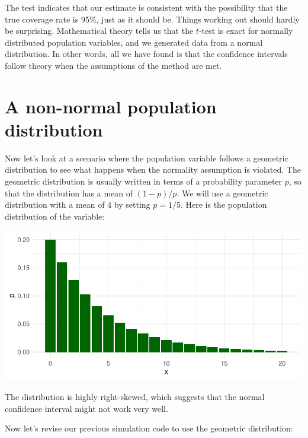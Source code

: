 \documentclass[
]{book}
\newenvironment{Shaded}{\begin{snugshade}}{\end{snugshade}}
\newcommand{\AttributeTok}[1]{\textcolor[rgb]{0.13,0.29,0.53}{#1}}
\newcommand{\DecValTok}[1]{\textcolor[rgb]{0.00,0.00,0.81}{#1}}
\newcommand{\FunctionTok}[1]{\textcolor[rgb]{0.13,0.29,0.53}{\textbf{#1}}}
\newcommand{\NormalTok}[1]{#1}
\newcommand{\OtherTok}[1]{\textcolor[rgb]{0.56,0.35,0.01}{#1}}
\newcommand{\SpecialCharTok}[1]{\textcolor[rgb]{0.81,0.36,0.00}{\textbf{#1}}}
\begin{document}
The test indicates that our estimate is consistent with the possibility that the true coverage rate is 95\%, just as it should be.
Things working out should hardly be surprising.
Mathematical theory tells us that the \(t\)-test is exact for normally distributed population variables, and we generated data from a normal distribution.
In other words, all we have found is that the confidence intervals follow theory when the assumptions of the method are met.

\section{A non-normal population distribution}\label{a-non-normal-population-distribution}

Now let's look at a scenario where the population variable follows a geometric distribution to see what happens when the normality assumption is violated.
The geometric distribution is usually written in terms of a probability parameter \(p\), so that the distribution has a mean of \((1 - p) / p\).
We will use a geometric distribution with a mean of 4 by setting \(p = 1/5\).
Here is the population distribution of the variable:

\begin{center}\includegraphics[width=0.75\linewidth]{Designing-Simulations-in-R_files/figure-latex/unnamed-chunk-33-1} \end{center}

The distribution is highly right-skewed, which suggests that the normal confidence interval might not work very well.

Now let's revise our previous simulation code to use the geometric distribution:

\begin{Shaded}
\end{Shaded}
\end{document}
